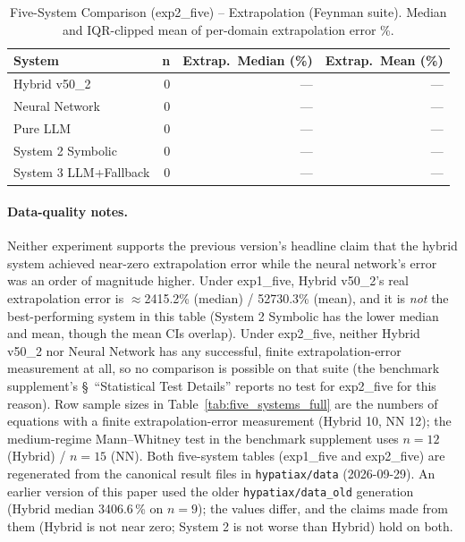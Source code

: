 \documentclass[twoside,11pt]{article}
\begin{document}
\begin{table}[t]
\centering
\caption{Five-System Comparison (exp2\_five) -- Extrapolation (Feynman
  suite). Median and IQR-clipped mean of per-domain extrapolation error \%.}
\label{tab:five_systems_extrapolation_exp2five}
\begin{tabular}{lrrr}
\toprule
\textbf{System} & \textbf{n}
  & \textbf{Extrap.\ Median (\%)} & \textbf{Extrap.\ Mean (\%)} \\
\midrule
Hybrid v50\_2 & 0 & --- & --- \\
Neural Network & 0 & --- & --- \\
Pure LLM & 0 & --- & --- \\
System 2 Symbolic & 0 & --- & --- \\
System 3 LLM+Fallback & 0 & --- & --- \\
\bottomrule
\end{tabular}
\end{table}

\paragraph{Data-quality notes.} Neither experiment supports the previous
version's headline claim that the hybrid system achieved near-zero
extrapolation error while the neural network's error was an order of
magnitude higher. Under exp1\_five, Hybrid v50\_2's real extrapolation
error is $\approx$2415.2\% (median) / 52730.3\% (mean), and it is
\emph{not} the best-performing system in this table (System 2 Symbolic has
the lower median and mean, though the mean CIs overlap). Under exp2\_five, neither Hybrid v50\_2 nor Neural
Network has any successful, finite extrapolation-error measurement at
all, so no comparison is possible on that suite (the benchmark
supplement's \S~``Statistical Test Details''
reports no test for exp2\_five for this reason). Row sample sizes in Table~\ref{tab:five_systems_full} are the numbers of equations
with a finite extrapolation-error measurement (Hybrid 10, NN 12); the
medium-regime Mann--Whitney test in the benchmark supplement uses $n=12$ (Hybrid) /
$n=15$ (NN). Both five-system tables (exp1\_five and exp2\_five) are regenerated
from the canonical result files in \texttt{hypatiax/data} (2026-09-29). An earlier
version of this paper used the older \texttt{hypatiax/data\_old} generation
(Hybrid median 3406.6\,\% on $n=9$); the values differ, and the claims made from them
(Hybrid is not near zero; System 2 is not worse than Hybrid) hold on both.
\end{document}
